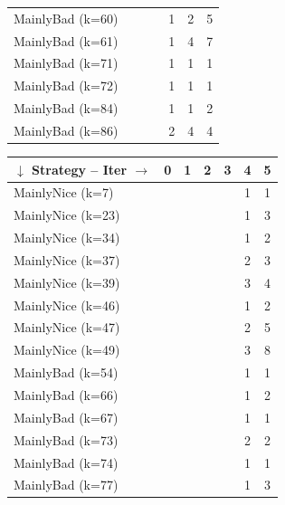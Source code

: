 \documentclass[journal,10pt,twoside]{IEEEtran}
\begin{document}
\begin{table}[ht]
\begin{minipage}{.4\textwidth}
\begin{tabular}{l|cccccc}
        MainlyBad (k=60)     &     &     &      &    1 &    2 &    5 \\
        MainlyBad (k=61)     &     &     &      &    1 &    4 &    7 \\
        MainlyBad (k=71)     &     &     &      &    1 &    1 &    1 \\
        MainlyBad (k=72)     &     &     &      &    1 &    1 &    1 \\
        MainlyBad (k=84)     &     &     &      &    1 &    1 &    2 \\
        MainlyBad (k=86)     &     &     &      &    2 &    4 &    4 \\ \bottomrule
    \end{tabular}
    \end{minipage} \quad
    \begin{minipage}{.4\textwidth}
    \begin{tabular}{l|cccccc} \toprule
        $\downarrow$ Strategy -- Iter $\rightarrow$ & 0 & 1 & 2 & 3 & 4 & 5 \\ \midrule
        MainlyNice (k=7)     &     &     &      &      &    1 &    1 \\
        MainlyNice (k=23)    &     &     &      &      &    1 &    3 \\
        MainlyNice (k=34)    &     &     &      &      &    1 &    2 \\
        MainlyNice (k=37)    &     &     &      &      &    2 &    3 \\
        MainlyNice (k=39)    &     &     &      &      &    3 &    4 \\
        MainlyNice (k=46)    &     &     &      &      &    1 &    2 \\
        MainlyNice (k=47)    &     &     &      &      &    2 &    5 \\
        MainlyNice (k=49)    &     &     &      &      &    3 &    8 \\
        MainlyBad (k=54)     &     &     &      &      &    1 &    1 \\
        MainlyBad (k=66)     &     &     &      &      &    1 &    2 \\
        MainlyBad (k=67)     &     &     &      &      &    1 &    1 \\
        MainlyBad (k=73)     &     &     &      &      &    2 &    2 \\
        MainlyBad (k=74)     &     &     &      &      &    1 &    1 \\
        MainlyBad (k=77)     &     &     &      &      &    1 &    3 \\

\end{tabular}
\end{minipage}
\end{table}
\end{document}
